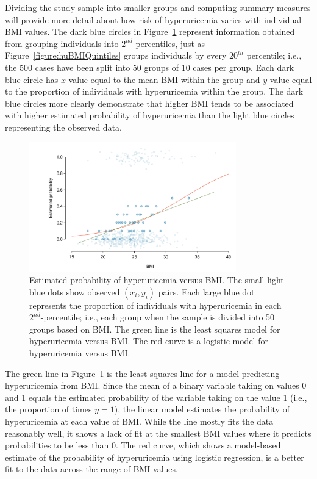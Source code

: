 Dividing the study sample into smaller groups and computing summary measures will provide more detail about how risk of hyperuricemia varies with individual BMI values. The dark blue circles in Figure~\ref{figure:bmiHuProbSecondTile} represent information obtained from grouping individuals into $2^{nd}$-percentiles, just as Figure~\ref{figure:huBMIQuintiles} groups individuals by every $20^{th}$ percentile; i.e., the 500 cases have been split into 50 groups of 10 cases per group. Each dark blue circle has $x$-value equal to the mean BMI within the group and $y$-value equal to the proportion of individuals with hyperuricemia within the group. The dark blue circles more clearly demonstrate that higher BMI tends to be associated with higher estimated probability of hyperuricemia than the light blue circles representing the observed data.

\begin{figure}[h!]
	\centering
	\includegraphics[width=0.80\textwidth]
	{ch_logistic_regression_oi_biostat/figures/bmiHuProbSecondTile/bmiHuProbSecondTile.pdf}
    \caption{Estimated probability of hyperuricemia versus BMI. The small light blue dots show observed $(x_i, y_i)$ pairs. Each large blue dot represents the proportion of individuals with hyperuricemia in each $2^{nd}$-percentile; i.e., each group when the sample is divided into 50 groups based on BMI. The green line is the least squares model for hyperuricemia versus BMI. The red curve is a logistic model for hyperuricemia versus BMI.}
    \label{figure:bmiHuProbSecondTile}
\end{figure}

The green line in Figure~\ref{figure:bmiHuProbSecondTile} is the least squares line for a model predicting hyperuricemia from BMI. Since the mean of a binary variable taking on values 0 and 1 equals the estimated probability of the variable taking on the value 1 (i.e., the proportion of times $y = 1$), the linear model estimates the probability of hyperuricemia at each value of BMI. While the line mostly fits the data reasonably well, it shows a lack of fit at the smallest BMI values where it predicts probabilities to be less than 0. The red curve, which shows a model-based estimate of the probability of hyperuricemia using logistic regression, is a better fit to the data across the range of BMI values.

